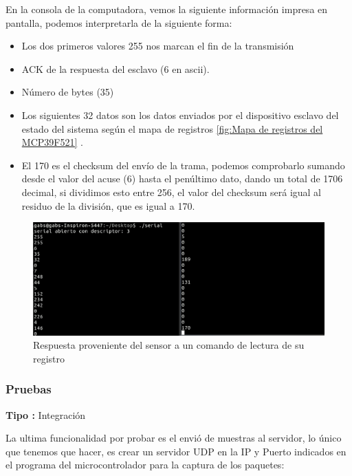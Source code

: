 En la consola de la computadora, vemos la siguiente información impresa en pantalla,  podemos interpretarla de la siguiente forma:

\begin{itemize}
    \item Los dos primeros valores 255 nos marcan el fin de la transmisión
    \item ACK de la respuesta del esclavo (6 en ascii).
    \item Número de bytes (35)
    \item Los siguientes 32 datos son los datos enviados por el dispositivo esclavo del estado del sistema según el mapa de registros \ref{fig:Mapa de registros del MCP39F521} .
    \item El 170 es el checksum del envío de la trama, podemos comprobarlo sumando desde el valor del acuse (6) hasta el penúltimo dato, dando un total de 1706 decimal, si dividimos esto entre 256, el valor del checksum será igual al residuo de la división, que es igual a 170.
\end{itemize}

\begin{figure}[H]
	\centering
	\includegraphics[scale=.3]{Capitulo5/images/consola.png}
	\caption{Respuesta proveniente del sensor a un comando de lectura de su registro}
	\label{fig:consola}
\end{figure} 

\subsubsection{Pruebas}
\textbf{Tipo :} Integración \\ \newline

La ultima funcionalidad por probar es el envió de muestras al servidor, lo único que tenemos que hacer, es crear un servidor UDP en la IP y Puerto indicados en el programa del microcontrolador para la captura de los paquetes:


